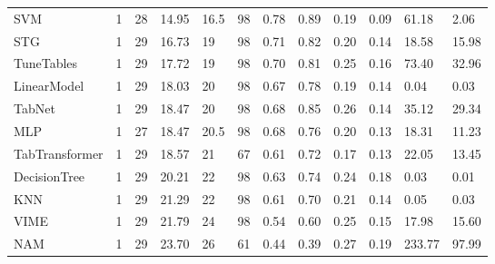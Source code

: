 \begin{tabular}{lllllrllllll}
SVM & 1 & 28 & 14.95 & 16.5 & 98 & 0.78 & 0.89 & 0.19 & 0.09 & 61.18 & 2.06 \\
STG & 1 & 29 & 16.73 & 19 & 98 & 0.71 & 0.82 & 0.20 & 0.14 & 18.58 & 15.98 \\
TuneTables & 1 & 29 & 17.72 & 19 & 98 & 0.70 & 0.81 & 0.25 & 0.16 & 73.40 & 32.96 \\
LinearModel & 1 & 29 & 18.03 & 20 & 98 & 0.67 & 0.78 & 0.19 & 0.14 & 0.04 & 0.03 \\
TabNet & 1 & 29 & 18.47 & 20 & 98 & 0.68 & 0.85 & 0.26 & 0.14 & 35.12 & 29.34 \\
MLP & 1 & 27 & 18.47 & 20.5 & 98 & 0.68 & 0.76 & 0.20 & 0.13 & 18.31 & 11.23 \\
TabTransformer & 1 & 29 & 18.57 & 21 & 67 & 0.61 & 0.72 & 0.17 & 0.13 & 22.05 & 13.45 \\
DecisionTree & 1 & 29 & 20.21 & 22 & 98 & 0.63 & 0.74 & 0.24 & 0.18 & 0.03 & 0.01 \\
KNN & 1 & 29 & 21.29 & 22 & 98 & 0.61 & 0.70 & 0.21 & 0.14 & 0.05 & 0.03 \\
VIME & 1 & 29 & 21.79 & 24 & 98 & 0.54 & 0.60 & 0.25 & 0.15 & 17.98 & 15.60 \\
NAM & 1 & 29 & 23.70 & 26 & 61 & 0.44 & 0.39 & 0.27 & 0.19 & 233.77 & 97.99 \\
\bottomrule
\end{tabular}
